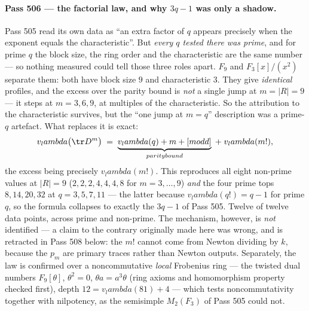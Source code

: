 \documentclass[12pt,a4paper]{article}
\def\mathbb#1{#1}%
\def\textbf#1{#1}%
\def\text#1{#1}%
\def\lambda{lambda}%
\theoremstyle{definition}
\newcommand{\FF}{\mathbb{F}}
\begin{document}
\paragraph{Pass 506 --- the factorial law, and why $3q{-}1$ was only a shadow.}
Pass 505 read its own data as ``an extra factor of $q$ appears precisely when
the exponent equals the characteristic''.  But \emph{every $q$ tested there was
prime}, and for prime $q$ the block size, the ring order and the characteristic
are the same number --- so nothing measured could tell those three roles apart.
$\FF_9$ and $\FF_3[x]/(x^2)$ separate them: both have block size $9$ and
characteristic $3$.  They give \emph{identical} profiles, and the excess over
the parity bound is \emph{not} a single jump at $m=|R|=9$ --- it steps at
$m=3,6,9$, at multiples of the \textbf{characteristic}.  So the attribution to
the characteristic survives, but the ``one jump at $m=q$'' description was a
prime-$q$ artefact.  What replaces it is exact:
\[
v_\lambda\bigl(\tr D^m\bigr)\;=\;\underbrace{v_\lambda(q)+m+[m\text{ odd}]}_{\text{parity bound}}\;+\;v_\lambda(m!),
\]
the excess being precisely $v_\lambda(m!)$.  This reproduces all eight
non-prime values at $|R|=9$ ($2,2,2,4,4,4,8$ for $m=3,\dots,9$) \emph{and} the
four prime tops $8,14,20,32$ at $q=3,5,7,11$ --- the latter because
$v_\lambda(q!)=q-1$ for prime $q$, so the formula collapses to exactly the
$3q-1$ of Pass 505.  Twelve of twelve data points, across prime and non-prime.
The mechanism, however, is \emph{not} identified --- a claim to the contrary
originally made here was wrong, and is retracted in Pass 508 below: the $m!$
cannot come from Newton dividing by $k$, because the $p_m$ are primary traces
rather than Newton outputs.  Separately, the law is confirmed over a
noncommutative \emph{local} Frobenius ring --- the twisted dual numbers
$\FF_9[\theta]$, $\theta^2=0$, $\theta a=a^3\theta$ (ring axioms and
homomorphism property checked first), depth $12=v_\lambda(81)+4$ --- which
tests noncommutativity together with nilpotency, as the semisimple $M_2(\FF_3)$
of Pass 505 could not.
\end{document}
